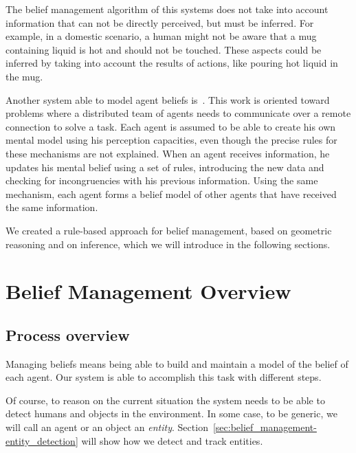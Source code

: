 The belief management algorithm of this systems does not take into account information that can not be directly perceived, but must be inferred. For example, in a domestic scenario, a human might not be aware that a mug containing liquid is hot and should not be touched. These aspects could be inferred by taking into account the results of actions, like pouring hot liquid in the mug.

Another system able to model agent beliefs is~\cite{scheutz2013computational}. This work is oriented toward problems where a distributed team of agents needs to communicate over a remote connection to solve a task. Each agent is assumed to be able to create his own mental model using his perception capacities, even though the precise rules for these mechanisms are not explained. When an agent receives information, he updates his mental belief using a set of rules, introducing the new data and checking for incongruencies with his previous information.  Using the same mechanism, each agent forms a belief model of other agents that have received the same information.

We created a rule-based approach for belief management, based on geometric reasoning and on inference, which we will introduce in the following sections. 

\section{Belief Management Overview}
\label{sec:belief_management-overview}

\subsection{Process overview}

Managing beliefs means being able to build and maintain a model of the belief of each agent. Our system is able to accomplish this task with different steps.

Of course, to reason on the current situation the system needs to be able to detect humans and objects in the environment. In some case, to be generic, we will call an agent or an object an \textit{entity}. Section~\ref{sec:belief_management-entity_detection} will show how we detect and track entities.

